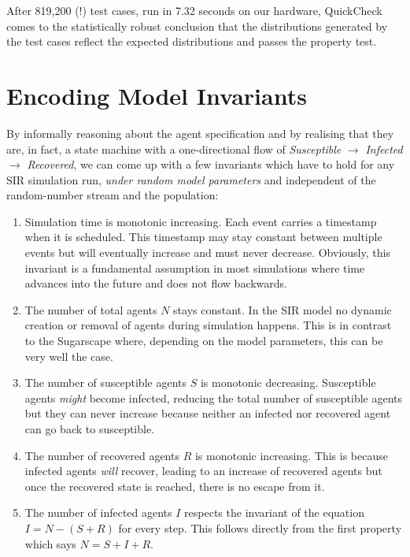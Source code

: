 After 819,200 (!) test cases, run in 7.32 seconds on our hardware, QuickCheck comes to the statistically robust conclusion that the distributions generated by the test cases reflect the expected distributions and passes the property test.

\section{Encoding Model Invariants}
\label{sec:enc_model_inv}
By informally reasoning about the agent specification and by realising that they are, in fact, a state machine with a one-directional flow of \textit{Susceptible} $\rightarrow$ \textit{Infected} $\rightarrow$ \textit{Recovered}, we can come up with a few invariants which have to hold for any SIR simulation run, \textit{under random model parameters} and independent of the random-number stream and the population:

\begin{enumerate}
	\item Simulation time is monotonic increasing. Each event carries a timestamp when it is scheduled. This timestamp may stay constant between multiple events but will eventually increase and must never decrease. Obviously, this invariant is a fundamental assumption in most simulations where time advances into the future and does not flow backwards.
	
	\item The number of total agents $N$ stays constant. In the SIR model no dynamic creation or removal of agents during simulation happens. This is in contrast to the Sugarscape where, depending on the model parameters, this can be very well the case.
	
	\item The number of susceptible agents $S$ is monotonic decreasing. Susceptible agents \textit{might} become infected, reducing the total number of susceptible agents but they can never increase because neither an infected nor recovered agent can go back to susceptible.
	
	\item The number of recovered agents $R$ is monotonic increasing. This is because infected agents \textit{will} recover, leading to an increase of recovered agents but once the recovered state is reached, there is no escape from it.
	
	\item The number of infected agents $I$ respects the invariant of the equation $I = N - (S + R)$ for every step. This follows directly from the first property which says $N = S + I + R$.
\end{enumerate}

